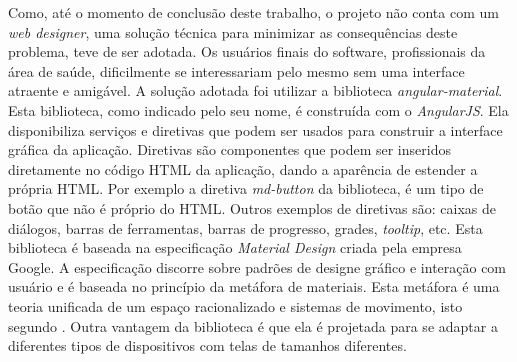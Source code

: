 Como, até o momento de conclusão deste trabalho, o projeto não conta com um \emph{web designer}, uma solução técnica para minimizar as consequências deste problema, teve de ser adotada. Os usuários finais do software, profissionais da área de saúde, dificilmente se interessariam pelo mesmo sem uma interface atraente e amigável.
A solução adotada foi utilizar a biblioteca \emph{angular-material}. 
Esta biblioteca, como indicado pelo seu nome, é construída com o \emph{AngularJS}. 
Ela disponibiliza serviços e diretivas que podem ser usados para construir a interface gráfica da aplicação. 
Diretivas são componentes que podem ser inseridos diretamente no código HTML da aplicação, dando a aparência de estender a própria HTML. 
Por exemplo a diretiva \emph{md-button} da biblioteca, é um tipo de botão que não é próprio do HTML. 
Outros exemplos de diretivas são: caixas de diálogos, barras de ferramentas, barras de progresso, grades, \emph{tooltip}, etc. 
Esta biblioteca é baseada na especificação \emph{Material Design} criada pela empresa Google. 
A especificação discorre sobre padrões de designe gráfico e interação com usuário e é baseada no princípio da metáfora de materiais. 
Esta metáfora é uma teoria unificada de um espaço racionalizado e sistemas de movimento, isto segundo \cite{Google2015a}. Outra vantagem da biblioteca é que ela é projetada para se adaptar a diferentes tipos de dispositivos com telas de tamanhos diferentes.
